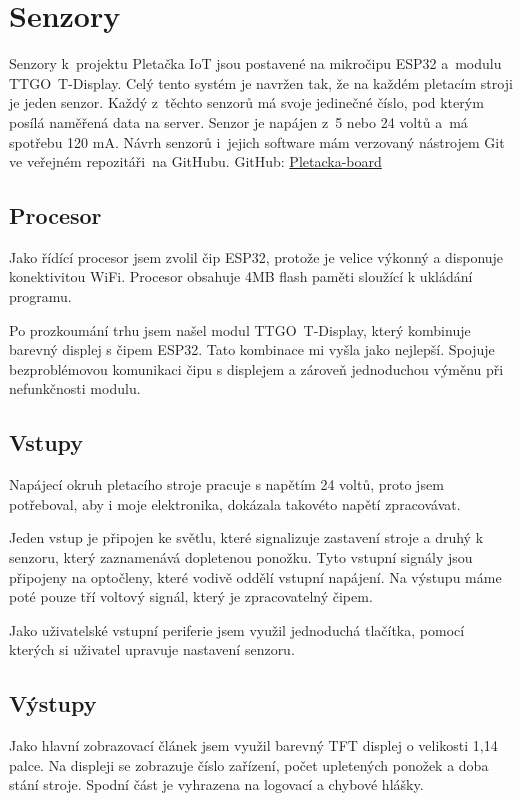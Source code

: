 \chapter{Senzory}

Senzory k~projektu Pletačka IoT jsou postavené na mikročipu ESP32 a~modulu TTGO~T-Display.
Celý tento systém je navržen tak, že na každém pletacím stroji je jeden senzor.
Každý z~těchto senzorů má svoje jedinečné číslo, pod kterým posílá naměřená data na server.
Senzor je napájen z~5 nebo 24 voltů a~má spotřebu 120 mA.
Návrh senzorů i~jejich software mám verzovaný nástrojem Git ve veřejném repozitáři~na GitHubu.\newline
GitHub: \href{https://github.com/Pletacka-IoT/Pletacka-board}{Pletacka-board}\cite{PL_BOARD}

\section{Procesor}
Jako řídící procesor jsem zvolil čip ESP32, protože je velice výkonný a disponuje konektivitou WiFi.
Procesor obsahuje 4MB flash paměti sloužící k ukládání programu.

Po prozkoumání trhu jsem našel modul TTGO~T-Display, který kombinuje barevný displej s čipem ESP32.
Tato kombinace mi vyšla jako nejlepší. 
Spojuje bezproblémovou komunikaci čipu s displejem a zároveň jednoduchou výměnu při nefunkčnosti modulu.


\section{Vstupy}
Napájecí okruh pletacího stroje pracuje s napětím 24 voltů, proto jsem potřeboval, aby i moje elektronika, dokázala takovéto napětí zpracovávat.

Jeden vstup je připojen ke světlu, které signalizuje zastavení stroje a druhý k senzoru, který zaznamenává dopletenou ponožku.
Tyto vstupní signály jsou připojeny na optočleny, které vodivě oddělí vstupní napájení.
Na výstupu máme poté pouze tří voltový signál, který je zpracovatelný čipem.

Jako uživatelské vstupní periferie jsem využil jednoduchá tlačítka, pomocí kterých si uživatel upravuje nastavení senzoru.


\section{Výstupy}
Jako hlavní zobrazovací článek jsem využil barevný TFT displej o velikosti 1,14 palce.
Na displeji se zobrazuje číslo zařízení, počet upletených ponožek a doba stání stroje.
Spodní část je vyhrazena na logovací a chybové hlášky.

